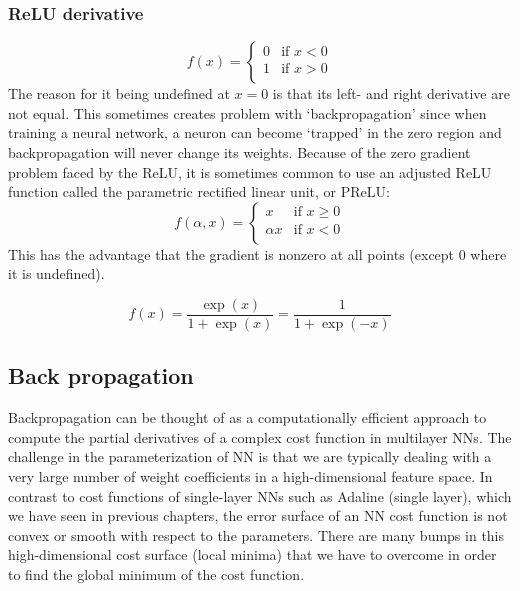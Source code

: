 \documentclass[11pt]{article}
\begin{document}
\subsubsection{ReLU derivative} 

\begin{equation} 
f(x)=
\begin{cases} 
0 & \text{if  }  x < 0 \\
1 & \text{if  }  x > 0 \\
\end{cases}
\end{equation} 
The reason for it being undefined at $x=0$ is that its left- and right derivative are not equal. 
This sometimes creates problem with `backpropagation' since 
when training a neural network, a neuron can become `trapped' in the zero region 
and backpropagation will never change its weights. Because of the zero gradient problem faced by the ReLU, 
it is sometimes common to use an adjusted ReLU function called the parametric rectified linear unit, or PReLU:
\begin{equation} 
f(\alpha, x)=
\begin{cases} 
x & \text{if  }  x \ge 0 \\
\alpha x & \text{if  }  x < 0 \\
\end{cases}
\end{equation} 
This has the advantage that the gradient is nonzero at all points (except 0 where it is undefined).


\begin{equation} 
f(x) = \dfrac{\exp(x)}{1+\exp(x)} = \dfrac{1}{1+\exp(-x)}
\end{equation} 



\subsection{Back propagation} 


Backpropagation can be thought of 
as a computationally efficient approach to 
compute the partial derivatives of a complex cost function
in multilayer NNs. The challenge in the parameterization of NN
is that we are typically dealing with a very large number of weight coefficients in a 
high-dimensional feature space. In contrast to cost functions of single-layer NNs such as 
Adaline (single layer), which we have seen in previous chapters, the error 
surface of an NN cost function is not convex or smooth with respect to the parameters. 
There are many bumps in this high-dimensional cost surface (local minima) 
that we have to overcome in order to find the global minimum of the cost function.
\end{document}
